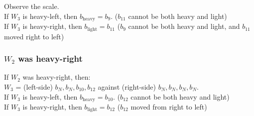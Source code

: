 \documentclass[12pt]{article}
\begin{document}
Observe the scale.\\

If $W_3$ is heavy-left, then $b_{\textrm{heavy}} = b_9$. ($b_{11}$ cannot be both heavy and light)\\
If $W_3$ is heavy-right, then $b_{\textrm{light}} = b_{11}$ ($b_9$ cannot be both heavy and light,
and $b_{11}$ moved right to left)\\

\subsubsection*{$W_2$ was heavy-right}

If $W_2$ was heavy-right, then:\\

$W_3$ = (left-side) ${b_N, b_N, b_{10}, b_{12}}$ against (right-side) ${b_N, b_N, b_N, b_N}$.\\
If $W_3$ is heavy-left, then $b_{\textrm{heavy}} = b_{10}$. ($b_{12}$ cannot be both heavy and light)\\
If $W_3$ is heavy-right, then $b_{\textrm{light}} = b_{12}$ ($b_{12}$ moved from right to left)\\
\end{document}
